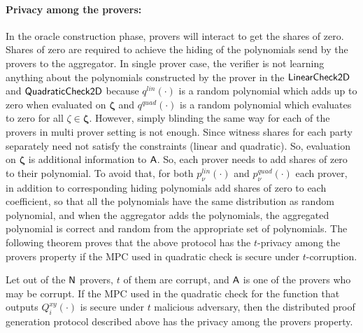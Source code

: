 \paragraph{Privacy among the provers: }  In the oracle construction phase, provers will interact to get the shares of zero. Shares of zero are required to achieve the hiding of the polynomials send by the provers to the aggregator. In single prover case, the verifier is not learning anything about the polynomials constructed by the prover in the $\mathsf{LinearCheck2D}$ and $\mathsf{QuadraticCheck2D}$ because $q^{lin}(\cdot)$ is a random polynomial which adds up to zero when evaluated on $\bm{\zeta}$ and $q^{quad}(\cdot)$ is a random polynomial which evaluates to zero for all $\zeta \in \bm{\zeta}$. However, simply blinding the same way for each of the provers in multi prover setting is not enough. 
Since witness shares for each party separately need not satisfy the constraints (linear and quadratic).  So, evaluation on $\bm{\zeta}$ is additional information to $\mathsf{A}$. So, each prover needs to add shares of zero to their polynomial. To avoid that, for both $p_{\nu}^{lin}(\cdot)$ and $p_{\nu}^{quad}(\cdot)$ each prover, in addition to corresponding hiding polynomials add shares of zero to each coefficient, so that all the polynomials have the same distribution as random polynomial, and when the aggregator adds the polynomials, the aggregated polynomial is correct and random from the appropriate set of polynomials.
The following theorem proves that the above protocol has the $t$-privacy among the provers property if the MPC used in quadratic check is secure under $t$-corruption.

\begin{theorem}
	Let out of the $\mathsf{N}$ provers, $t$ of them are corrupt, and $\mathsf{A}$ is one of the provers who may be corrupt. If the MPC used in the quadratic check for the function that outputs $Q^{xy}_i(\cdot)$ is secure under $t$ malicious adversary, then the distributed proof generation protocol described above has the privacy among the provers property. 
\end{theorem} 

